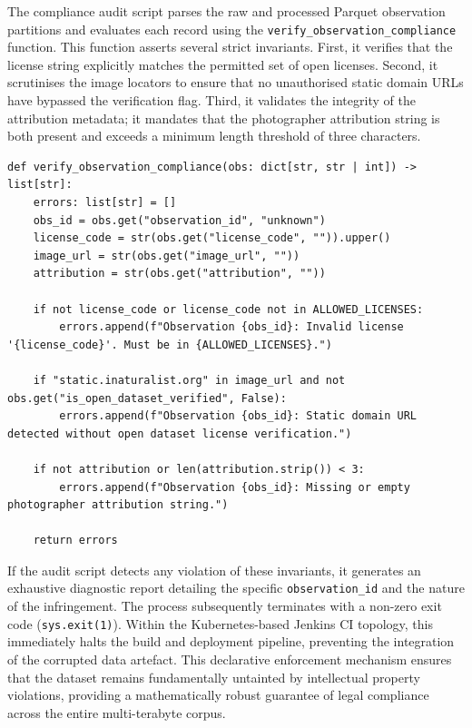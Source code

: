 The compliance audit script parses the raw and processed Parquet observation partitions and evaluates each record using the \texttt{verify\_observation\_compliance} function. This function asserts several strict invariants. First, it verifies that the license string explicitly matches the permitted set of open licenses. Second, it scrutinises the image locators to ensure that no unauthorised static domain URLs have bypassed the verification flag. Third, it validates the integrity of the attribution metadata; it mandates that the photographer attribution string is both present and exceeds a minimum length threshold of three characters.

\begin{listing}[htbp]
\begin{verbatim}
def verify_observation_compliance(obs: dict[str, str | int]) -> list[str]:
    errors: list[str] = []
    obs_id = obs.get("observation_id", "unknown")
    license_code = str(obs.get("license_code", "")).upper()
    image_url = str(obs.get("image_url", ""))
    attribution = str(obs.get("attribution", ""))

    if not license_code or license_code not in ALLOWED_LICENSES:
        errors.append(f"Observation {obs_id}: Invalid license '{license_code}'. Must be in {ALLOWED_LICENSES}.")

    if "static.inaturalist.org" in image_url and not obs.get("is_open_dataset_verified", False):
        errors.append(f"Observation {obs_id}: Static domain URL detected without open dataset license verification.")

    if not attribution or len(attribution.strip()) < 3:
        errors.append(f"Observation {obs_id}: Missing or empty photographer attribution string.")

    return errors
\end{verbatim}
\caption{Execution of legal invariants within \texttt{verify\_observation\_compliance}.}
\label{lst:compliance_audit}
\end{listing}

If the audit script detects any violation of these invariants, it generates an exhaustive diagnostic report detailing the specific \texttt{observation\_id} and the nature of the infringement. The process subsequently terminates with a non-zero exit code (\texttt{sys.exit(1)}). Within the Kubernetes-based Jenkins CI topology, this immediately halts the build and deployment pipeline, preventing the integration of the corrupted data artefact. This declarative enforcement mechanism ensures that the dataset remains fundamentally untainted by intellectual property violations, providing a mathematically robust guarantee of legal compliance across the entire multi-terabyte corpus.

